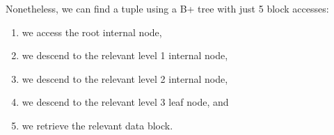 \documentclass[a4paper, openany]{memoir}
\theoremstyle{definition}
\begin{document}
\begin{answer}
\begin{itemize}
        Nonetheless, we can find a tuple using a B+ tree with just 5 block accesses:
        \begin{enumerate}
            \item we access the root internal node, 
            \item we descend to the relevant level 1 internal node,
            \item we descend to the relevant level 2 internal node,
            \item we descend to the relevant level 3 leaf node, and
            \item we retrieve the relevant data block.
        \end{enumerate}
    \end{itemize}
\end{answer}
\end{document}
